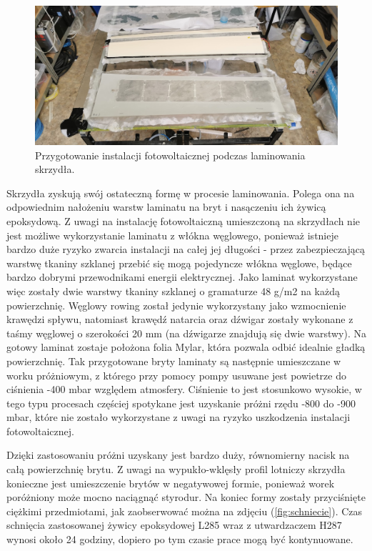 \documentclass[12pt, a4paper]{article}
\let\oldref\ref
\renewcommand{\ref}[1]{(\oldref{#1})}
\begin{document}
 \begin{figure}[ht]
    \centering
    \includegraphics[width=1\textwidth]{budowa7}
    \caption{Przygotowanie instalacji fotowoltaicznej podczas laminowania skrzydła.}
    \label{fig:laminowanie}
\end{figure}

Skrzydła zyskują swój ostateczną formę w procesie laminowania. Polega ona na odpowiednim nałożeniu warstw laminatu na bryt i nasączeniu ich żywicą epoksydową. Z uwagi na instalację fotowoltaiczną umieszczoną na skrzydłach nie jest możliwe wykorzystanie laminatu z włókna węglowego, ponieważ istnieje bardzo duże ryzyko zwarcia instalacji na całej jej długości - przez zabezpieczającą warstwę tkaniny szklanej przebić się mogą pojedyncze włókna węglowe, będące bardzo dobrymi przewodnikami energii elektrycznej. Jako laminat wykorzystane więc zostały dwie warstwy tkaniny szklanej o gramaturze 48 g/m2 na każdą powierzchnię. Węglowy rowing został jedynie wykorzystany jako wzmocnienie krawędzi spływu, natomiast krawędź natarcia oraz dźwigar zostały wykonane z taśmy węglowej o szerokości 20 mm (na dźwigarze znajdują się dwie warstwy). Na gotowy laminat zostaje położona folia Mylar, która pozwala odbić idealnie gładką powierzchnię. Tak przygotowane bryty laminaty są następnie umieszczane w worku próżniowym, z którego przy pomocy pompy usuwane jest powietrze do ciśnienia -400 mbar względem atmosfery. Ciśnienie to jest stosunkowo wysokie, w tego typu procesach częściej spotykane jest uzyskanie próżni rzędu -800 do -900 mbar, które nie zostało wykorzystane z uwagi na ryzyko uszkodzenia instalacji fotowoltaicznej.

Dzięki zastosowaniu próżni uzyskany jest bardzo duży, równomierny nacisk na całą powierzchnię brytu. Z uwagi na wypukło-wklęsły profil lotniczy skrzydła konieczne jest umieszczenie brytów w negatywowej formie, ponieważ worek poróżniony może mocno naciągnąć styrodur. Na koniec formy zostały przyciśnięte ciężkimi przedmiotami, jak zaobserwować można na zdjęciu \ref{fig:schniecie}. Czas schnięcia zastosowanej żywicy epoksydowej L285 wraz z utwardzaczem H287 wynosi około 24 godziny, dopiero po tym czasie prace mogą być kontynuowane.
\end{document}
